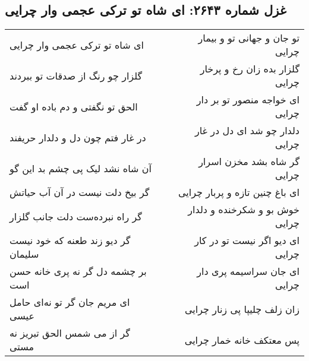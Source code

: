 \begin{center}
\section*{غزل شماره ۲۶۴۳: ای شاه تو ترکی عجمی وار چرایی}
\label{sec:2643}
\begin{longtable}{l p{0.5cm} r}
ای شاه تو ترکی عجمی وار چرایی
&&
تو جان و جهانی تو و بیمار چرایی
\\
گلزار چو رنگ از صدقات تو ببردند
&&
گلزار بده زان رخ و پرخار چرایی
\\
الحق تو نگفتی و دم باده او گفت
&&
ای خواجه منصور تو بر دار چرایی
\\
در غار فتم چون دل و دلدار حریفند
&&
دلدار چو شد ای دل در غار چرایی
\\
آن شاه نشد لیک پی چشم بد این گو
&&
گر شاه بشد مخزن اسرار چرایی
\\
گر بیخ دلت نیست در آن آب حیاتش
&&
ای باغ چنین تازه و پربار چرایی
\\
گر راه نبرده‌ست دلت جانب گلزار
&&
خوش بو و شکرخنده و دلدار چرایی
\\
گر دیو زند طعنه که خود نیست سلیمان
&&
ای دیو اگر نیست تو در کار چرایی
\\
بر چشمه دل گر نه پری خانه حسن است
&&
ای جان سراسیمه پری دار چرایی
\\
ای مریم جان گر تو نه‌ای حامل عیسی
&&
زان زلف چلیپا پی زنار چرایی
\\
گر از می شمس الحق تبریز نه مستی
&&
پس معتکف خانه خمار چرایی
\\
\end{longtable}
\end{center}

